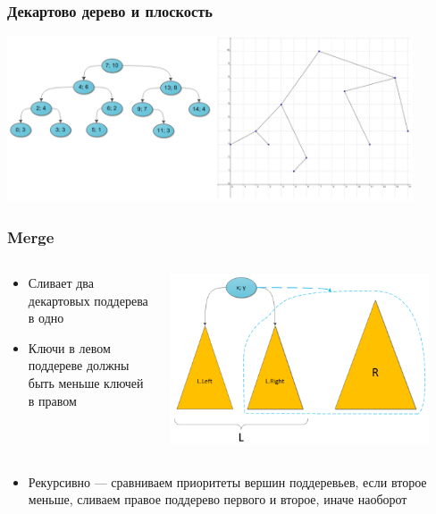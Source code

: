 \documentclass{../../slides-style}
\begin{document}
    \begin{frame}
        \frametitle{Декартово дерево и плоскость}
        \begin{center}
            \includegraphics[width=0.9\textwidth]{treap-and-plain.png}
        \end{center}
    \end{frame}

    \begin{frame}
        \frametitle{Merge}
        \begin{columns}
            \begin{column}{0.3\textwidth}
                \begin{itemize}
                    \item Сливает два декартовых поддерева в одно
                    \item Ключи в левом поддереве должны быть меньше ключей в правом
                \end{itemize}
            \end{column}
            \begin{column}{0.7\textwidth}
                \begin{center}
                    \includegraphics[width=0.9\textwidth]{treap-merge.png}
                \end{center}
            \end{column}
        \end{columns}
        \begin{itemize}
            \item Рекурсивно --- сравниваем приоритеты вершин поддеревьев, если второе меньше, сливаем правое поддерево первого и второе, иначе наоборот
        \end{itemize}
    \end{frame}
\end{document}
